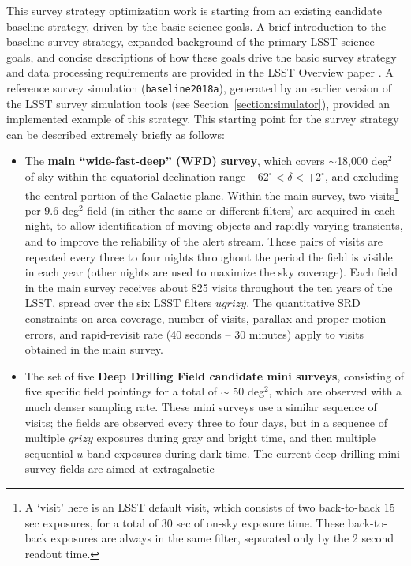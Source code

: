 This survey strategy optimization work is starting from an existing candidate baseline strategy, driven by the basic science goals. A brief introduction to the baseline survey strategy, expanded background of the primary LSST science goals, and concise descriptions of how these goals drive the basic survey strategy and data processing requirements are provided in the LSST Overview paper \citep{2019ApJ...873..111I}. A reference survey simulation ({\tt baseline2018a}), generated by an earlier version of the LSST survey simulation tools (see Section~\ref{section:simulator}), provided an implemented example of this strategy. This starting point for the survey strategy can be described extremely briefly as follows:
\begin{itemize}
\item The {\bf main ``wide-fast-deep''  (WFD) survey}, which covers $\sim$18,000 deg$^2$ of sky within
the equatorial declination
range $-62^\circ < \delta < +2^\circ$, and excluding the central portion of the Galactic
plane. Within the main survey, two visits\footnote{A `visit' here is an LSST default visit, which
consists of two back-to-back 15 sec exposures, for a total of 30 sec of on-sky exposure time. These back-to-back exposures are always
in the same filter, separated only by the 2 second readout time.}
per 9.6 deg$^2$ field (in either the same or different filters) are acquired in each night, to allow identification of moving objects and rapidly varying transients, and to improve
the reliability of the alert stream. These pairs of visits are repeated every three to four nights throughout the period the field is visible in each year (other nights are used to maximize the sky coverage). Each
field in the main survey receives about 825 visits throughout the ten years of the LSST, spread over the six LSST filters
$ugrizy$. The quantitative SRD constraints on area coverage, number of visits, parallax and proper motion errors, and
rapid-revisit rate (40 seconds -- 30 minutes) apply to visits obtained in the main survey.
\item The set of five {\bf Deep Drilling Field candidate mini surveys}, consisting of five specific field pointings for a total of $\sim$ 50 deg$^2$,
which are observed with a much denser sampling rate. These mini surveys use a similar sequence of visits; the fields
are observed every three to four days, but in a sequence of multiple $grizy$ exposures during gray and bright time, and then
multiple sequential $u$ band exposures during dark time. The current deep drilling mini survey fields are aimed at extragalactic

\end{itemize}

